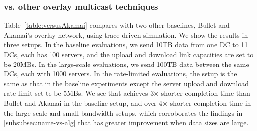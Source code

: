 \subsubsection{\name vs. other overlay multicast techniques}

Table~\ref{table:versusAkamai} compares \name with two other
baselines, Bullet and Akamai's overlay network, using trace-driven
simulation. We show the results in three setups. In the baseline evaluations,
we send 10TB data from one DC to 11 DCs, each has 100 servers, and
the upload and download link capacities are set to be 20MBs. In the
large-scale evaluations, we send 100TB data between the same DCs, each with
1000 servers. In the rate-limited evaluations, the setup is the same as that in the baseline experiments
except the server upload and download rate limit set to be 5MBs.
We see that \name achieves 3$\times$ shorter completion time than
Bullet and Akamai in the baseline setup, and over 4$\times$ shorter
completion time in the large-scale and small bandwidth setups, which
corroborates the findings in \Section\ref{subsubsec:name-vs-alg} that
\name has greater improvement when data sizes are large.

\begin{table}[t]
\begin{center}
\end{center}
\label{table:versusAkamai}
\vspace{-0.4cm}
\end{table}

